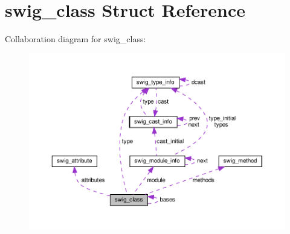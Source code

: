 \hypertarget{structswig__class}{}\section{swig\+\_\+class Struct Reference}
\label{structswig__class}


Collaboration diagram for swig\+\_\+class\+:\nopagebreak
\begin{figure}[H]
\begin{center}
\leavevmode
\includegraphics[width=350pt]{structswig__class__coll__graph}
\end{center}
\end{figure}
